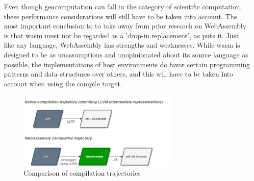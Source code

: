 Even though geocomputation can fall in the category of scientific computation, these performance considerations will still have to be taken into account. The most important conclusion to to take away from prior research on WebAssembly is that \ac{wasm} must not be regarded as a 'drop-in replacement', as \citet{melch_performance_2019} puts it. Just like any language, WebAssembly has strengths and weaknesses. While \ac{wasm} is designed to be as unassumptious and unopinionated about its source language as possible, the implementations of host environments do favor certain programming patterns and data structures over others, and this will have to be taken into account when using the compile target.

\begin{figure}[!tbp]
  \centering
  \begin{minipage}[b]{0.80\textwidth}
    \graphicspath{ {../../assets/images/2/} }
    \includegraphics[width=300px]{wasm-perf.png}
    \caption{Comparison of compilation trajectories}
    \label{fig:wasm-trajectory}
  \end{minipage}
\end{figure}



